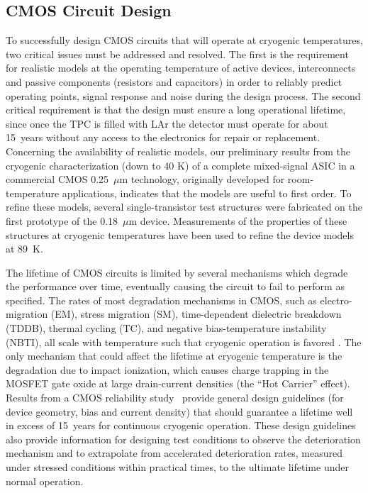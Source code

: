 \subsection{CMOS Circuit Design}

To successfully design CMOS circuits that will operate at cryogenic 
temperatures, two critical issues must be addressed and resolved. 
The first is the requirement for realistic models at the operating temperature 
of active devices, interconnects and passive components (resistors and 
capacitors) in order to reliably predict operating points, signal response 
and noise during the design process. The second critical requirement is 
that the design must ensure a long operational lifetime, since once the TPC is filled 
with LAr the detector must operate for about 15~years without any access to the 
electronics for repair or replacement. Concerning the availability of realistic models, 
our preliminary results from the cryogenic characterization (down to 40 K) of a complete 
mixed-signal ASIC \cite{CMOS-Compton} in a commercial CMOS 0.25~$\mu$m technology, 
originally developed for room-temperature applications, indicates that the models 
are useful to first order. To refine these models, several 
single-transistor test structures were fabricated on the first prototype of the 0.18~$\mu$m device. 
Measurements of the properties of these structures at cryogenic temperatures 
have been used to refine the device models at 89~K. 

The lifetime of CMOS circuits is limited by several mechanisms which degrade 
the performance over time, eventually causing the circuit to fail to perform as specified. 
The rates of most degradation mechanisms in CMOS, such as electro-migration (EM), 
stress migration (SM), time-dependent dielectric breakdown (TDDB), thermal cycling (TC), 
and negative bias-temperature instability (NBTI), all scale with temperature such that 
cryogenic operation is favored \cite{CMOS-lifetime}\cite{PMOS-model}. The only mechanism 
that could affect the lifetime at cryogenic temperature is the degradation due to 
impact ionization, which causes charge trapping in the MOSFET gate oxide at 
large drain-current densities (the ``Hot Carrier'' effect). Results from a CMOS reliability study~\cite{CMOS-reliability} 
provide general design guidelines (for device geometry, bias and current density) 
that should guarantee a lifetime well in excess of 15~years for continuous cryogenic operation. 
These design guidelines also provide information for designing test conditions to observe the 
deterioration mechanism and to extrapolate from accelerated deterioration rates, 
measured under stressed conditions within practical times, to the ultimate lifetime under normal operation.

